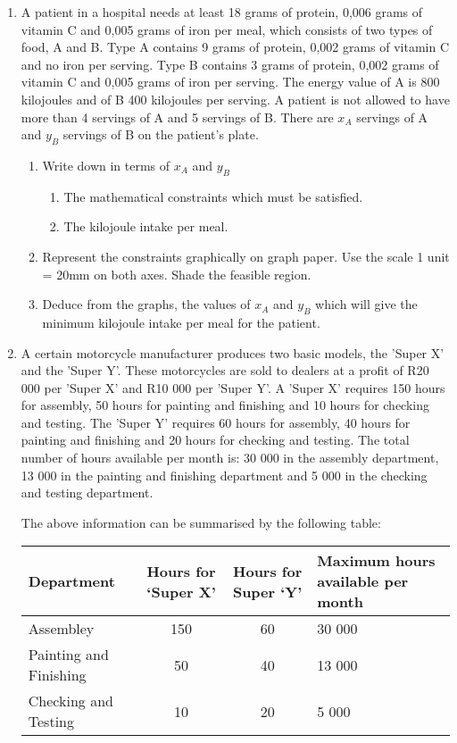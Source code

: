 \begin{enumerate}
\item{A patient in a hospital needs at least 18 grams of protein, 0,006 grams of vitamin C and 0,005 grams of iron per meal, which consists of two types of food, A and B. Type A contains 9 grams of protein, 0,002 grams of vitamin C and no iron per serving. Type B contains 3 grams of protein, 0,002 grams of vitamin C and 0,005 grams of iron per serving. The energy value of A is 800 kilojoules and of B 400 kilojoules per serving. A patient is not allowed to have more than 4 servings of A and 5 servings of B. There are $x_A$ servings of A and $y_B$ servings of B on the patient's plate.
\begin{enumerate}
\item{Write down in terms of $x_A$ and $y_B$}
\begin{enumerate}
\item{The mathematical constraints which must be satisfied.}
\item{The kilojoule intake per meal.}
\end{enumerate}
\item{Represent the constraints graphically on graph paper. Use the scale 1 unit = 20mm on both axes. Shade the feasible region.}
\item{Deduce from the graphs, the values of $x_A$ and $y_B$ which will give the minimum kilojoule intake per meal for the patient.}
\end{enumerate}}
\item{A certain motorcycle manufacturer produces two basic models, the 'Super X' and the 'Super Y'. These motorcycles are sold to dealers at a profit of R20 000 per 'Super X' and R10 000 per 'Super Y'. A 'Super X' requires 150 hours for assembly, 50 hours for painting and finishing and 10 hours for checking and testing. The 'Super Y' requires 60 hours for assembly, 40 hours for painting and finishing and 20 hours for checking and testing. The total number of hours available per month is: 30 000 in the assembly department, 13 000 in the painting and finishing department and 5 000 in the checking and testing department.

The above information can be summarised by the following table:

\begin{center}
\begin{tabular}{|l|c|c|p{3cm}|}\hline
Department& Hours for `Super X'&Hours for Super `Y'& Maximum hours available per month\\\hline\hline
Assembley&150&60&30 000\\\hline
Painting and Finishing & 50& 40 &13 000\\\hline
Checking and Testing &10&20&5 000\\\hline
\end{tabular}
\end{center}

}
\end{enumerate}
